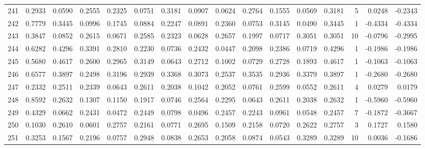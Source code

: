 \begin{tabular}{lrrrrrrrrrrrrrrr}
241 &      0.2933 &  0.0590 &  0.2555 &  0.2325 &  0.0751 &  0.3181 &  0.0907 &  0.0624 &  0.2764 &  0.1555 &   0.0569 &     0.3181 &      5 &                    0.0248 &                    -0.2343 \\
242 &      0.7779 &  0.3445 &  0.0996 &  0.1745 &  0.0884 &  0.2247 &  0.0891 &  0.2360 &  0.0753 &  0.3145 &   0.0490 &     0.3445 &      1 &                   -0.4334 &                    -0.4334 \\
243 &      0.3847 &  0.0852 &  0.2615 &  0.0671 &  0.2585 &  0.2323 &  0.0628 &  0.2657 &  0.1997 &  0.0717 &   0.3051 &     0.3051 &     10 &                   -0.0796 &                    -0.2995 \\
244 &      0.6282 &  0.4296 &  0.3391 &  0.2810 &  0.2230 &  0.0736 &  0.2432 &  0.0447 &  0.2098 &  0.2386 &   0.0719 &     0.4296 &      1 &                   -0.1986 &                    -0.1986 \\
245 &      0.5680 &  0.4617 &  0.2600 &  0.2965 &  0.3149 &  0.0643 &  0.2712 &  0.1002 &  0.0729 &  0.2728 &   0.1893 &     0.4617 &      1 &                   -0.1063 &                    -0.1063 \\
246 &      0.6577 &  0.3897 &  0.2498 &  0.3196 &  0.2939 &  0.3368 &  0.3073 &  0.2537 &  0.3535 &  0.2936 &   0.3379 &     0.3897 &      1 &                   -0.2680 &                    -0.2680 \\
247 &      0.2332 &  0.2511 &  0.2339 &  0.0643 &  0.2611 &  0.2038 &  0.1042 &  0.2052 &  0.0761 &  0.2599 &   0.0552 &     0.2611 &      4 &                    0.0279 &                     0.0179 \\
248 &      0.8592 &  0.2632 &  0.1307 &  0.1150 &  0.1917 &  0.0746 &  0.2564 &  0.2295 &  0.0643 &  0.2611 &   0.2038 &     0.2632 &      1 &                   -0.5960 &                    -0.5960 \\
249 &      0.4329 &  0.0662 &  0.2431 &  0.0472 &  0.2449 &  0.0798 &  0.0496 &  0.2457 &  0.2243 &  0.0961 &   0.0548 &     0.2457 &      7 &                   -0.1872 &                    -0.3667 \\
250 &      0.1030 &  0.2610 &  0.0601 &  0.2757 &  0.2161 &  0.0771 &  0.2695 &  0.1509 &  0.2158 &  0.0720 &   0.2622 &     0.2757 &      3 &                    0.1727 &                     0.1580 \\
251 &      0.3253 &  0.1567 &  0.2196 &  0.0757 &  0.2948 &  0.0838 &  0.2653 &  0.2058 &  0.0874 &  0.0543 &   0.3289 &     0.3289 &     10 &                    0.0036 &                    -0.1686 \\

\end{tabular}
